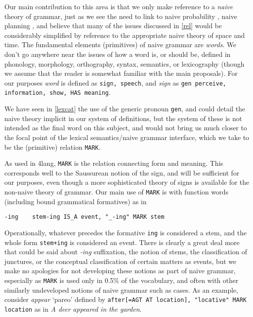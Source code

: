 \documentclass[11pt,bookmarks,bookmarksnumbered,naturalnames,plainpages=false,pdftex,colorlinks=true,urlcolor=blue,bookmarksdepth=subsection,plainpages=false]{paper}
\begin{document}
Our main contribution to this area is that we only make reference to a {\it
  naive} theory of grammar, just as we see the need to link to naive
probability \citep{Gyenis:2019}, naive planning \citep{Gordon:2017}, and
believe that many of the issues discussed in \ref{rel} would be considerably
simplified by reference to the appropriate naive theory of space and time.
The fundamental elements (primitives) of naive grammar are {\it words}. We
don't go anywhere near the issues of how a word is, or should be, defined in
phonology, morphology, orthography, syntax, semantics, or lexicography (though
we assume that the reader is somewhat familiar with the main proposals). For
our purposes {\it word} is defined as {\tt sign, speech}, and {\it sign} as
{\tt gen perceive, information, show, HAS meaning}.

We have seen in \ref{lexcat} the use of the generic pronoun {\tt gen}, and
could detail the naive theory implicit in our system of definitions, but the
system of these is not intended as the final word on this subject, and would
not bring us much closer to the focal point of the lexical semantics/naive
grammar interface, which we take to be the (primitive) relation {\tt MARK}.

As used in 4lang, {\tt MARK} is the relation connecting form and meaning. This
corresponds well to the Saussurean notion of the sign, and will be sufficient
for our purposes, even though a more sophisticated theory of signs
\citep{Kracht:2011} is available for the non-naive theory of grammar. Our main
use of {\tt MARK} is with function words (including bound grammatical formatives) as
in

\begin{verbatim}
-ing    stem-ing IS_A event, "_-ing" MARK stem
\end{verbatim}

Operationally, whatever precedes the formative {\tt ing} is considered a stem,
and the whole form {\tt stem+ing} is considered an event. There is clearly a
great deal more that could be said about {\it -ing} suffixation, the notion of
stems, the classification of junctures, or the conceptual classification of
certain matters as events, but we make no apologies for not developing these
notions as part of naive grammar, especially as {\tt MARK} is used only in
0.5\% of the vocabulary, and often with other similarly undeveloped notions of
naive grammar such as cases. As an example, consider {\it appear} `pareo'
defined by {\tt after[=AGT AT location], "locative" MARK location} as in
{\it A deer appeared in the garden}.
\end{document}

